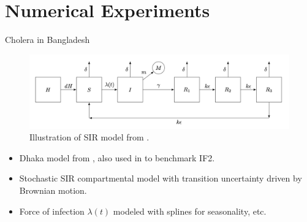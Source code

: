 \documentclass{beamer}
\begin{document}
\section{Numerical Experiments}

\begin{frame}{Cholera in Bangladesh}

    \begin{figure}
        \centering
        \includegraphics[scale=0.5]{imgs/dacca.png}
        \caption{Illustration of SIR model from \cite{king08}.}
        \label{fig:sir}
    \end{figure}
    
    \begin{itemize}
        \item Dhaka model from \cite{king08}, also used in \cite{ionides15} to benchmark IF2.
        \item \pause Stochastic SIR compartmental model with transition uncertainty driven by Brownian motion.
        \item \pause Force of infection $\lambda(t)$ modeled with splines for seasonality, etc.
    \end{itemize}
    
\end{frame}
\end{document}

